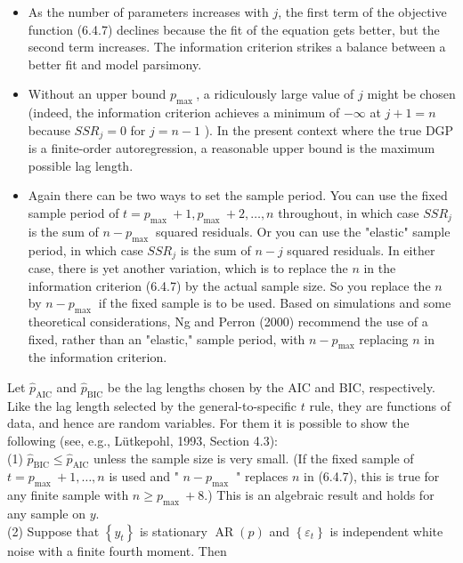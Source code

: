 \documentclass[10pt]{article}
\begin{document}
\begin{itemize}
  \item As the number of parameters increases with $j$, the first term of the objective function (6.4.7) declines because the fit of the equation gets better, but the second term increases. The information criterion strikes a balance between a better fit and model parsimony.
  \item Without an upper bound $p_{\text {max }}$, a ridiculously large value of $j$ might be chosen (indeed, the information criterion achieves a minimum of $-\infty$ at $j+1=n$ because $S S R_{j}=0$ for $j=n-1$ ). In the present context where the true DGP is a finite-order autoregression, a reasonable upper bound is the maximum possible lag length.
  \item Again there can be two ways to set the sample period. You can use the fixed sample period of $t=p_{\text {max }}+1, p_{\text {max }}+2, \ldots, n$ throughout, in which case $S S R_{j}$ is the sum of $n-p_{\text {max }}$ squared residuals. Or you can use the "elastic" sample period, in which case $S S R_{j}$ is the sum of $n-j$ squared residuals. In either case, there is yet another variation, which is to replace the $n$ in the information criterion (6.4.7) by the actual sample size. So you replace the $n$ by $n-p_{\text {max }}$ if the fixed sample is to be used. Based on simulations and some theoretical considerations, Ng and Perron (2000) recommend the use of a fixed, rather than an "elastic," sample period, with $n-p_{\max }$ replacing $n$ in the information criterion.
\end{itemize}

Let $\hat{p}_{\mathrm{AIC}}$ and $\hat{p}_{\mathrm{BIC}}$ be the lag lengths chosen by the AIC and BIC, respectively. Like the lag length selected by the general-to-specific $t$ rule, they are functions of data, and hence are random variables. For them it is possible to show the following (see, e.g., Lütkepohl, 1993, Section 4.3):\\
(1) $\hat{p}_{\mathrm{BIC}} \leq \hat{p}_{\mathrm{AIC}}$ unless the sample size is very small. (If the fixed sample of $t=p_{\text {max }}+1, \ldots, n$ is used and " $n-p_{\text {max }}$ " replaces $n$ in (6.4.7), this is true for any finite sample with $n \geq p_{\text {max }}+8$.) This is an algebraic result and holds for any sample on $y$.\\
(2) Suppose that $\left\{y_{t}\right\}$ is stationary $\operatorname{AR}(p)$ and $\left\{\varepsilon_{t}\right\}$ is independent white noise with a finite fourth moment. Then
\end{document}
